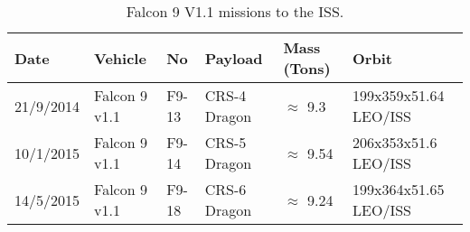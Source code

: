 \begin{table}[!htb]
\centering
\begin{tabular}{|l|l|l|l|l|l|}
\hline
\rowcolor[HTML]{C0C0C0} 
Date      & Vehicle       & No    & Payload      & Mass (Tons)         & Orbit                  \\ \hline
21/9/2014 & Falcon 9 v1.1 & F9-13 & CRS-4 Dragon & $\approx$ 9.3  & 199x359x51.64  LEO/ISS \\ \hline
\rowcolor[HTML]{EFEFEF} 
10/1/2015 & Falcon 9 v1.1 & F9-14 & CRS-5 Dragon & $\approx$ 9.54 & 206x353x51.6 LEO/ISS   \\ \hline
14/5/2015 & Falcon 9 v1.1 & F9-18 & CRS-6 Dragon & $\approx$ 9.24 & 199x364x51.65  LEO/ISS \\ \hline
\end{tabular}
\caption{Falcon 9 V1.1 missions to the ISS.}
\label{tab:Falcon9Missions}
\end{table}
\cite{Falcon9Stats}
